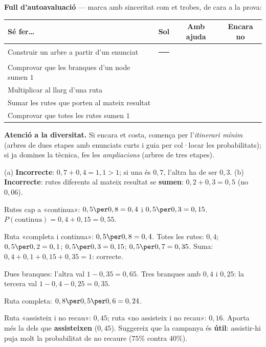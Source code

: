 \begin{idea}
\textbf{Full d'autoavaluació} — marca amb sinceritat com et trobes, de cara a la prova:
\begin{center}
\renewcommand{\arraystretch}{1.4}
\begin{tabular}{p{8.2cm} c c c}
\toprule
\textbf{Sé fer\dots} & \textbf{Sol} & \textbf{Amb ajuda} & \textbf{Encara no} \\
\midrule
Construir un arbre a partir d'un enunciat & \rule{0.7cm}{0pt} & & \\
Comprovar que les branques d'un node sumen $1$ & & & \\
Multiplicar al llarg d'una ruta & & & \\
Sumar les rutes que porten al mateix resultat & & & \\
Comprovar que totes les rutes sumen $1$ & & & \\
\bottomrule
\end{tabular}
\end{center}
\end{idea}

\noindent\textbf{Atenció a la diversitat.} Si encara et costa, comença per l'\emph{itinerari
mínim} (arbres de dues etapes amb enunciats curts i guia per col·locar les
probabilitats); si ja domines la tècnica, fes les \emph{ampliacions} (arbres de tres
etapes).

\begin{solucions}
\begin{sollist}
  \item (a) \textbf{Incorrecte}: $0,7+0,4=1,1>1$; si una és $0,7$, l'altra ha de ser
        $0,3$. \quad (b) \textbf{Incorrecte}: rutes diferents al mateix resultat se
        \textbf{sumen}: $0,2+0,3=0,5$ (no $0,06$).
  \item Rutes cap a «continua»: $0,5\per 0,8=0,4$ i $0,5\per 0,3=0,15$.
        $P(\text{continua})=0,4+0,15=0,55$.
  \item Ruta «completa i continua»: $0,5\per 0,8=0,4$. Totes les rutes: $0,4$;
        $0,5\per 0,2=0,1$; $0,5\per 0,3=0,15$; $0,5\per 0,7=0,35$. Suma:
        $0,4+0,1+0,15+0,35=1$: correcte.
  \item Dues branques: l'altra val $1-0,35=0,65$. Tres branques amb $0,4$ i $0,25$: la
        tercera val $1-0,4-0,25=0,35$.
  \item Ruta completa: $0,8\per 0,5\per 0,6=0,24$.
  \item Ruta «assisteix i no recau»: $0,45$; ruta «no assisteix i no recau»: $0,16$.
        Aporta més la dels que \textbf{assisteixen} ($0,45$). Suggereix que la campanya
        és \textbf{útil}: assistir-hi puja molt la probabilitat de no recaure ($75\%$
        contra $40\%$).
\end{sollist}
\end{solucions}
